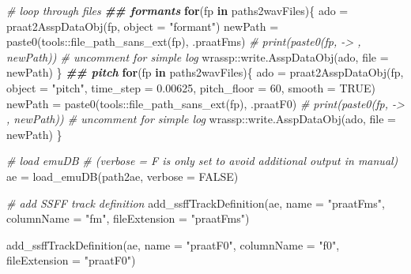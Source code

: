 \documentclass[
]{book}
\newenvironment{Shaded}{\begin{snugshade}}{\end{snugshade}}
\newcommand{\AttributeTok}[1]{\textcolor[rgb]{0.77,0.63,0.00}{#1}}
\newcommand{\CommentTok}[1]{\textcolor[rgb]{0.56,0.35,0.01}{\textit{#1}}}
\newcommand{\ConstantTok}[1]{\textcolor[rgb]{0.00,0.00,0.00}{#1}}
\newcommand{\ControlFlowTok}[1]{\textcolor[rgb]{0.13,0.29,0.53}{\textbf{#1}}}
\newcommand{\DecValTok}[1]{\textcolor[rgb]{0.00,0.00,0.81}{#1}}
\newcommand{\DocumentationTok}[1]{\textcolor[rgb]{0.56,0.35,0.01}{\textbf{\textit{#1}}}}
\newcommand{\FloatTok}[1]{\textcolor[rgb]{0.00,0.00,0.81}{#1}}
\newcommand{\FunctionTok}[1]{\textcolor[rgb]{0.00,0.00,0.00}{#1}}
\newcommand{\NormalTok}[1]{#1}
\newcommand{\OtherTok}[1]{\textcolor[rgb]{0.56,0.35,0.01}{#1}}
\newcommand{\SpecialCharTok}[1]{\textcolor[rgb]{0.00,0.00,0.00}{#1}}
\newcommand{\StringTok}[1]{\textcolor[rgb]{0.31,0.60,0.02}{#1}}
\begin{document}
\begin{Shaded}
\begin{Highlighting}[]
\CommentTok{\# loop through files}
\DocumentationTok{\#\# formants}
\ControlFlowTok{for}\NormalTok{(fp }\ControlFlowTok{in}\NormalTok{ paths2wavFiles)\{}
\NormalTok{  ado }\OtherTok{=} \FunctionTok{praat2AsspDataObj}\NormalTok{(fp, }\AttributeTok{object =} \StringTok{"formant"}\NormalTok{)}
\NormalTok{  newPath }\OtherTok{=} \FunctionTok{paste0}\NormalTok{(tools}\SpecialCharTok{::}\FunctionTok{file\_path\_sans\_ext}\NormalTok{(fp), }\StringTok{\textquotesingle{}.praatFms\textquotesingle{}}\NormalTok{)}
  \CommentTok{\# print(paste0(fp, \textquotesingle{} {-}\textgreater{} \textquotesingle{}, newPath)) \# uncomment for simple log}
\NormalTok{  wrassp}\SpecialCharTok{::}\FunctionTok{write.AsspDataObj}\NormalTok{(ado, }\AttributeTok{file =}\NormalTok{ newPath)}
\NormalTok{\}}
\DocumentationTok{\#\# pitch}
\ControlFlowTok{for}\NormalTok{(fp }\ControlFlowTok{in}\NormalTok{ paths2wavFiles)\{}
\NormalTok{  ado }\OtherTok{=} \FunctionTok{praat2AsspDataObj}\NormalTok{(fp,}
                          \AttributeTok{object =} \StringTok{"pitch"}\NormalTok{,}
                          \AttributeTok{time\_step =} \FloatTok{0.00625}\NormalTok{,}
                          \AttributeTok{pitch\_floor =} \DecValTok{60}\NormalTok{,}
                          \AttributeTok{smooth =} \ConstantTok{TRUE}\NormalTok{)}
\NormalTok{  newPath }\OtherTok{=} \FunctionTok{paste0}\NormalTok{(tools}\SpecialCharTok{::}\FunctionTok{file\_path\_sans\_ext}\NormalTok{(fp), }\StringTok{\textquotesingle{}.praatF0\textquotesingle{}}\NormalTok{)}
  \CommentTok{\# print(paste0(fp, \textquotesingle{} {-}\textgreater{} \textquotesingle{}, newPath)) \# uncomment for simple log}
\NormalTok{  wrassp}\SpecialCharTok{::}\FunctionTok{write.AsspDataObj}\NormalTok{(ado, }\AttributeTok{file =}\NormalTok{ newPath)}
\NormalTok{\}}

\CommentTok{\# load emuDB}
\CommentTok{\# (verbose = F is only set to avoid additional output in manual)}
\NormalTok{ae }\OtherTok{=} \FunctionTok{load\_emuDB}\NormalTok{(path2ae, }\AttributeTok{verbose =} \ConstantTok{FALSE}\NormalTok{)}

\CommentTok{\# add SSFF track definition}
\FunctionTok{add\_ssffTrackDefinition}\NormalTok{(ae,}
                        \AttributeTok{name =} \StringTok{"praatFms"}\NormalTok{,}
                        \AttributeTok{columnName =} \StringTok{"fm"}\NormalTok{,}
                        \AttributeTok{fileExtension =} \StringTok{"praatFms"}\NormalTok{)}

\FunctionTok{add\_ssffTrackDefinition}\NormalTok{(ae,}
                        \AttributeTok{name =} \StringTok{"praatF0"}\NormalTok{,}
                        \AttributeTok{columnName =} \StringTok{"f0"}\NormalTok{,}
                        \AttributeTok{fileExtension =} \StringTok{"praatF0"}\NormalTok{)}


\end{Highlighting}
\end{Shaded}
\end{document}
